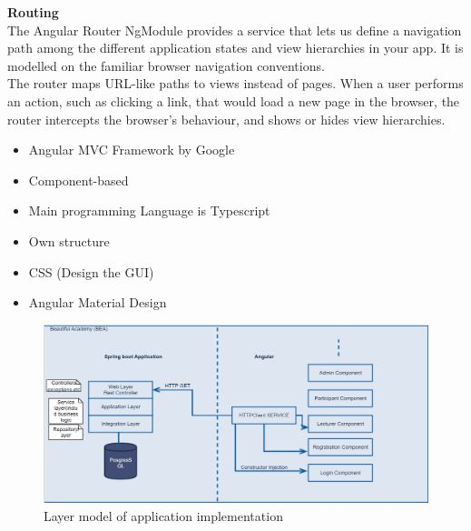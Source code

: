 \documentclass{scrartcl}
\begin{document}
\textbf{Routing}\\
The Angular Router NgModule provides a service that lets us define a navigation path among the different application states and view hierarchies in your app. It is modelled on the familiar browser navigation conventions.\\
The router maps URL-like paths to views instead of pages. When a user performs an action, such as clicking a link, that would load a new page in the browser, the router intercepts the browser's behaviour, and shows or hides view hierarchies.\\




\begin{itemize}
	\item	Angular MVC Framework by Google
	\item	Component-based
	\item	Main programming Language is Typescript
	\item	Own structure
	\item	CSS (Design the GUI)
	\item   Angular Material Design

\end{itemize}
\begin{figure}[H]
\centering
\includegraphics[width = 130mm]{layer.JPG}
\caption{Layer model of application implementation}
\label{layers}
\end{figure}
\end{document}
